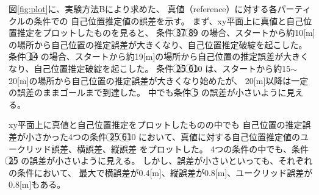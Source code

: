 \documentclass{jarticle}
\begin{document}
図\ref{fig:plot}に、実験方法Bにより求めた、
真値（reference）に対する各パーティクルの条件での
自己位置推定値の誤差を示す。
まず、xy平面上に真値と自己位置推定をプロットしたものを見ると、
条件
\textcircled{\scriptsize 3}\textcircled{\scriptsize 7}\noindent
\textcircled{\scriptsize 8}\textcircled{\scriptsize 9}\noindent
の場合、スタートから約10[m]の場所から自己位置の推定誤差が大きくなり、自己位置推定破綻を起こした。
条件
\textcircled{\scriptsize 1}\textcircled{\scriptsize 4}\noindent
の場合、スタートから約19[m]の場所から自己位置の推定誤差が大きくなり、自己位置推定破綻を起こした。
条件
\textcircled{\scriptsize 2}\textcircled{\scriptsize 5}\noindent
\textcircled{\scriptsize 6}\textcircled{\scriptsize 10}\noindent
は、スタートから約15$\sim$20[m]の場所から自己位置の推定誤差が大きくなり始めたが、
20[m]以降は一定の誤差のままゴールまで到達した。
中でも条件
\textcircled{\scriptsize 5}\noindent
の誤差が小さいように見える。

xy平面上に真値と自己位置推定をプロットしたものの中でも
自己位置の推定誤差が小さかった4つの条件
\textcircled{\scriptsize 2}\textcircled{\scriptsize 5}\noindent
\textcircled{\scriptsize 6}\textcircled{\scriptsize 10}\noindent
において、真値に対する自己位置推定値のユークリッド誤差、横誤差、縦誤差
をプロットした。
4つの条件の中でも、条件
\textcircled{\scriptsize 2}\textcircled{\scriptsize 5}\noindent
の誤差が小さいように見える。
しかし、誤差が小さいといっても、それぞれの条件において、
最大で横誤差が0.4[m]、縦誤差が0.8[m]、ユークリッド誤差が0.8[m]もある。
\end{document}
